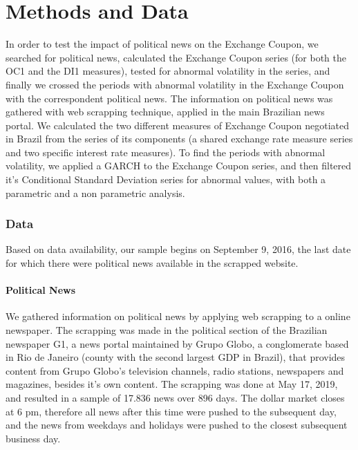 \documentclass[cic,tc, english]{iiufrgs}
\begin{document}
\chapter{Methods and Data} \label{chapter_methods_data}

    In order to test the impact of political news on the Exchange Coupon, we searched for political news, calculated the Exchange Coupon series (for both the OC1 and the DI1 measures), tested for abnormal volatility in the series, and finally we crossed the periods with abnormal volatility in the Exchange Coupon with the correspondent political news. The information on political news was gathered with web scrapping technique, applied in the main Brazilian news portal. We calculated the two different measures of Exchange Coupon negotiated in Brazil from the series of its components (a shared exchange rate measure series and two specific interest rate measures). To find the periods with abnormal volatility, we applied a GARCH to the Exchange Coupon series, and then filtered it's Conditional Standard Deviation series for abnormal values, with both a parametric and a non parametric analysis.

\subsection{Data} \label{chapter_data}

    Based on data availability, our sample begins on September 9, 2016, the last date for which there were political news available in the scrapped website.

\subsubsection{Political News} \label{chapter_political_news}
    
    We gathered information on political news by applying web scrapping to a online newspaper. The scrapping was made in the political section of the Brazilian newspaper G1, a news portal maintained by Grupo Globo, a conglomerate based in Rio de Janeiro (county with the second largest GDP in Brazil), that provides content from Grupo Globo's television channels, radio stations, newspapers and magazines, besides it's own content. The scrapping was done at May 17, 2019, and resulted in a sample of 17.836 news over 896 days. The dollar market closes at 6 pm, therefore all news after this time were pushed to the subsequent day, and the news from weekdays and holidays were pushed to the closest subsequent business day.
\end{document}
